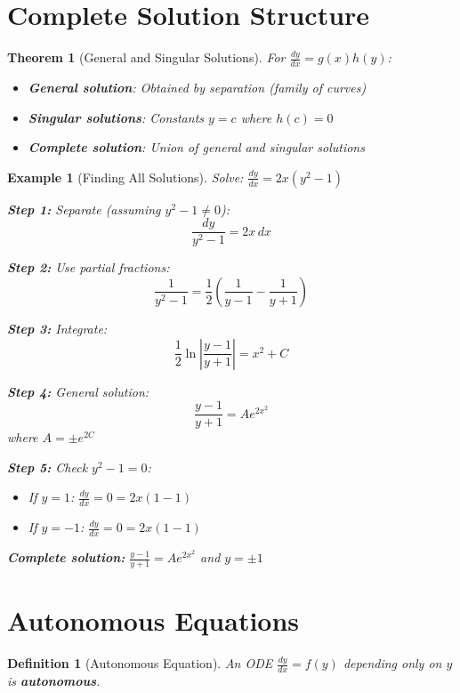 \documentclass[12pt]{article}
\newtheorem{definition}{Definition}
\newtheorem{theorem}{Theorem}
\newtheorem{example}{Example}
\begin{document}
\section{Complete Solution Structure}

\begin{theorem}[General and Singular Solutions]
For $\frac{dy}{dx} = g(x)h(y)$:
\begin{itemize}
    \item \textbf{General solution}: Obtained by separation (family of curves)
    \item \textbf{Singular solutions}: Constants $y = c$ where $h(c) = 0$
    \item \textbf{Complete solution}: Union of general and singular solutions
\end{itemize}
\end{theorem}

\begin{example}[Finding All Solutions]
Solve: $\frac{dy}{dx} = 2x(y^2 - 1)$

\textbf{Step 1:} Separate (assuming $y^2 - 1 \neq 0$):
$$\frac{dy}{y^2 - 1} = 2x\,dx$$

\textbf{Step 2:} Use partial fractions:
$$\frac{1}{y^2-1} = \frac{1}{2}\left(\frac{1}{y-1} - \frac{1}{y+1}\right)$$

\textbf{Step 3:} Integrate:
$$\frac{1}{2}\ln\left|\frac{y-1}{y+1}\right| = x^2 + C$$

\textbf{Step 4:} General solution:
$$\frac{y-1}{y+1} = Ae^{2x^2}$$ where $A = \pm e^{2C}$

\textbf{Step 5:} Check $y^2 - 1 = 0$:
\begin{itemize}
    \item If $y = 1$: $\frac{dy}{dx} = 0 = 2x(1-1)$ \checkmark
    \item If $y = -1$: $\frac{dy}{dx} = 0 = 2x(1-1)$ \checkmark
\end{itemize}

\textbf{Complete solution:} $\frac{y-1}{y+1} = Ae^{2x^2}$ and $y = \pm 1$
\end{example}

\section{Autonomous Equations}

\begin{definition}[Autonomous Equation]
An ODE $\frac{dy}{dx} = f(y)$ depending only on $y$ is \textbf{autonomous}.
\end{definition}
\end{document}
